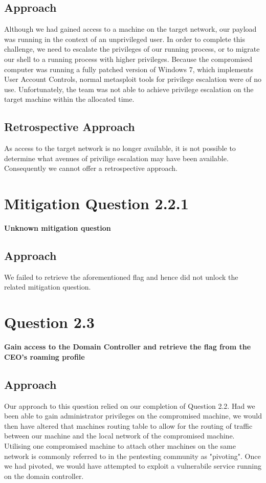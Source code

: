 \subsection{Approach}
Although we had gained access to a machine on the target network, our payload was running in the context of an unprivileged user. In order to complete this challenge, we need to escalate the privileges of our running process, or to migrate our shell to a running process with higher privileges. Because the compromised computer was running a fully patched version of Windows 7, which implements User Account Controls, normal metasploit tools for privilege escalation were of no use. Unfortunately, the team was not able to achieve privilege escalation on the target machine within the allocated time.
\subsection{Retrospective Approach}
As access to the target network is no longer available, it is not possible to determine what avenues of privilige escalation may have been available. Consequently we cannot offer a retrospective approach.
\section{Mitigation Question 2.2.1}
\textbf{Unknown mitigation question}
\subsection{Approach}
We failed to retrieve the aforementioned flag and hence did not unlock the
related mitigation question.

\section{Question 2.3}
\textbf{Gain access to the Domain Controller and retrieve the flag from the
CEO's roaming profile}
\subsection{Approach}
Our approach to this question relied on our completion of Question 2.2. Had we been able to gain administrator privileges on the compromised machine, we would then have altered that machines routing table to allow for the routing of traffic between our machine and the local network of the compromised machine. Utilising one compromised machine to attach other machines on the same network is commonly referred to in the pentesting community as "pivoting". Once we had pivoted, we would have attempted to exploit a vulnerabile service running on the domain controller. 
